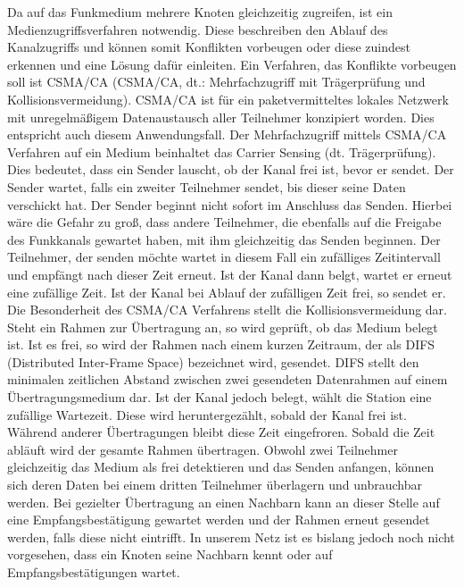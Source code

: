 \documentclass{IEEEtran}
\begin{document}
    Da auf das Funkmedium mehrere Knoten gleichzeitig zugreifen, ist ein 
    Medienzugriffsverfahren notwendig. Diese beschreiben den Ablauf des 
    Kanalzugriffs und können somit Konflikten vorbeugen oder diese zuindest 
    erkennen und eine Lösung dafür einleiten. Ein Verfahren, das Konflikte 
    vorbeugen soll ist \acl{CSMA/CA} 
    (\acs{CSMA/CA}, dt.: Mehrfachzugriff mit Trägerprüfung und Kollisionsvermeidung). 
    \acs{CSMA/CA} ist für ein paketvermitteltes lokales Netzwerk mit unregelmäßigem 
    Datenaustausch aller Teilnehmer konzipiert worden. Dies entspricht auch 
    diesem Anwendungsfall.
    Der Mehrfachzugriff mittels \acs{CSMA/CA} Verfahren auf ein Medium beinhaltet das 
    Carrier Sensing (dt. Trägerprüfung). Dies bedeutet, dass ein Sender lauscht, 
    ob der Kanal frei ist, bevor er sendet. Der Sender wartet, falls ein zweiter 
    Teilnehmer sendet, bis dieser seine Daten verschickt hat. Der Sender beginnt 
    nicht sofort im Anschluss das Senden. Hierbei wäre die Gefahr zu groß, dass 
    andere Teilnehmer, die ebenfalls auf die Freigabe des Funkkanals gewartet 
    haben, mit ihm gleichzeitig das Senden beginnen. Der Teilnehmer, der senden 
    möchte wartet in diesem Fall ein zufälliges Zeitintervall und empfängt nach 
    dieser Zeit erneut. Ist der Kanal dann belgt, wartet er erneut eine 
    zufällige Zeit. Ist der Kanal bei Ablauf der zufälligen Zeit frei, so sendet 
    er.
    Die Besonderheit des \acs{CSMA/CA} Verfahrens stellt die Kollisionsvermeidung dar. 
    Steht ein Rahmen zur Übertragung an, so wird geprüft, ob das Medium belegt 
    ist. Ist es frei, so wird der Rahmen nach einem kurzen Zeitraum, der als 
    DIFS (Distributed Inter-Frame Space) bezeichnet wird, gesendet. DIFS stellt 
    den minimalen zeitlichen Abstand zwischen zwei gesendeten Datenrahmen auf 
    einem Übertragungsmedium dar. Ist der Kanal jedoch belegt, wählt die Station 
    eine zufällige Wartezeit. Diese wird heruntergezählt, sobald der Kanal frei 
    ist. Während anderer Übertragungen bleibt diese Zeit eingefroren. Sobald die 
    Zeit abläuft wird der gesamte Rahmen übertragen. 
    Obwohl zwei Teilnehmer gleichzeitig das Medium als frei detektieren und das 
    Senden anfangen, können sich deren Daten bei einem dritten Teilnehmer 
    überlagern und unbrauchbar werden. Bei gezielter Übertragung an einen 
    Nachbarn kann an dieser Stelle auf eine Empfangsbestätigung gewartet werden 
    und der Rahmen erneut gesendet werden, falls diese nicht eintrifft. In 
    unserem Netz ist es bislang jedoch noch nicht vorgesehen, dass ein Knoten 
    seine Nachbarn kennt oder auf Empfangsbestätigungen wartet. 
\end{document}
